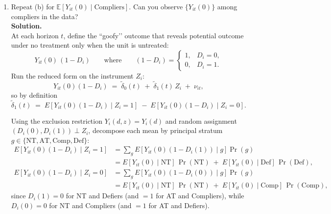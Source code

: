 \documentclass[12pt]{article}
\begin{document}
\begin{enumerate}[label=\textbf{(\alph*)}, leftmargin=1.5em]
  \noindent\textit{Note.} The first stage $\pi_1=\Pr(\text{Comp})-\Pr(\text{Def})$ is time-invariant, while the reduced form $\delta_1(t)$ varies with $t$ because $Y_{it}$ accumulates readmissions over days since birth. Without monotonicity, $\delta_1(t)$ identifies a weighted difference between complier and defier means and cannot by itself recover $E[Y_{it}(1)\mid\text{Comp}]$ unless $\Pr(\text{Def})=0$ or further assumptions are imposed.

  \item Repeat (b) for $\mathbb{E}[Y_{it}(0)\mid\text{Compliers}]$. Can you observe $\{Y_{it}(0)\}$ among compliers in the data?\\[0.5em]
  
  \textbf{Solution.} \\

  At each horizon $t$, define the “goofy’’ outcome that reveals potential outcome under no treatment only when the unit is untreated:
    \[
    Y_{it}(0)\,(1-D_i)
    \qquad\text{where}\qquad
    (1-D_i)=
    \begin{cases}
    1, & D_i=0,\\
    0, & D_i=1.
    \end{cases}
    \]
    Run the reduced form on the instrument $Z_i$:
    \[
    Y_{it}(0)(1-D_i)\;=\;\tilde\delta_0(t)\;+\;\tilde\delta_1(t)\,Z_i\;+\;\nu_{it},
    \]
    so by definition
    \[
    \tilde\delta_1(t)\;=\;E\!\left[Y_{it}(0)(1-D_i)\mid Z_i=1\right]\;-\;E\!\left[Y_{it}(0)(1-D_i)\mid Z_i=0\right].
    \]

    Using the exclusion restriction $Y_i(d,z)=Y_i(d)$ and random assignment $(D_i(0),D_i(1))\!\perp\! Z_i$, decompose each mean by principal stratum $g\in\{\text{NT},\text{AT},\text{Comp},\text{Def}\}$:
    \[
    \begin{aligned}
    E\!\left[Y_{it}(0)(1-D_i)\mid Z_i=1\right]
    &=\sum_g E\!\left[Y_{it}(0)(1-D_i(1))\mid g\right]\Pr(g)\\
    &=E[Y_{it}(0)\mid \text{NT}]\,\Pr(\text{NT})\;+\;E[Y_{it}(0)\mid \text{Def}]\,\Pr(\text{Def}),\\[0.5em]
    E\!\left[Y_{it}(0)(1-D_i)\mid Z_i=0\right]
    &=\sum_g E\!\left[Y_{it}(0)(1-D_i(0))\mid g\right]\Pr(g)\\
    &=E[Y_{it}(0)\mid \text{NT}]\,\Pr(\text{NT})\;+\;E[Y_{it}(0)\mid \text{Comp}]\,\Pr(\text{Comp}),
    \end{aligned}
    \]
    since $D_i(1)=0$ for NT and Defiers (and $=1$ for AT and Compliers), while $D_i(0)=0$ for NT and Compliers (and $=1$ for AT and Defiers).


\end{enumerate}
\end{document}
